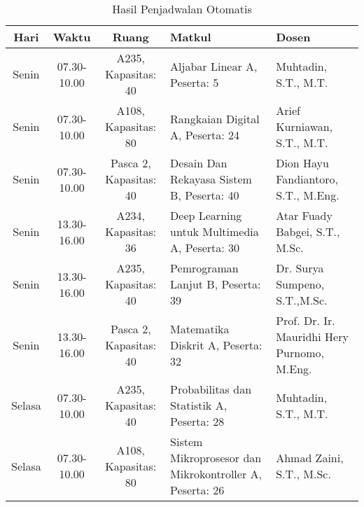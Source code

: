 \begin{longtable}[c]{|c|c|c|>{\centering\arraybackslash}m{3cm}|>{\centering\arraybackslash}m{3cm}|}
  \caption{Hasil Penjadwalan Otomatis}
  \label{tab:jadwal}\\
  \hline
  Hari   & Waktu       & Ruang                  & Matkul                                                              & Dosen                                         \\ \hline
  \rowcolor[HTML]{DAE8FC} 
  Senin  & 07.30-10.00 & A235, Kapasitas: 40    & Aljabar Linear A, \linebreak Peserta: 5                             & Muhtadin, S.T., M.T.                          \\ \hline
  \rowcolor[HTML]{DAE8FC} 
  Senin  & 07.30-10.00 & A108, Kapasitas: 80    & Rangkaian Digital A, \linebreak Peserta: 24                         & Arief Kurniawan, S.T., M.T.                   \\ \hline
  \rowcolor[HTML]{DAE8FC} 
  Senin  & 07.30-10.00 & Pasca 2, Kapasitas: 40 & Desain Dan Rekayasa Sistem B, \linebreak Peserta: 40                & Dion Hayu Fandiantoro, S.T., M.Eng.           \\ \hline
  \rowcolor[HTML]{DAE8FC} 
  Senin  & 13.30-16.00 & A234, Kapasitas: 36    & Deep Learning untuk Multimedia A, \linebreak Peserta: 30            & Atar Fuady Babgei, S.T., M.Sc.                \\ \hline
  \rowcolor[HTML]{DAE8FC} 
  Senin  & 13.30-16.00 & A235, Kapasitas: 40    & Pemrograman Lanjut B, \linebreak Peserta: 39                        & Dr. Surya Sumpeno, S.T.,M.Sc.                 \\ \hline
  \rowcolor[HTML]{DAE8FC} 
  Senin  & 13.30-16.00 & Pasca 2, Kapasitas: 40 & Matematika Diskrit A, \linebreak Peserta: 32                        & Prof. Dr. Ir. Mauridhi Hery Purnomo, M.Eng.   \\ \hline
  Selasa & 07.30-10.00 & A235, Kapasitas: 40    & Probabilitas dan Statistik A, \linebreak Peserta: 28                & Muhtadin, S.T., M.T.                          \\ \hline
  Selasa & 07.30-10.00 & A108, Kapasitas: 80    & Sistem Mikroprosesor dan Mikrokontroller A, \linebreak Peserta: 26  & Ahmad Zaini, S.T., M.Sc.                      \\ \hline

\end{longtable}
